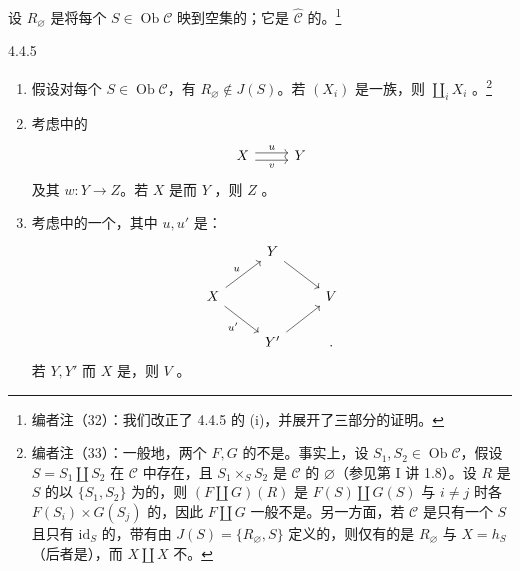 设 $R_{\varnothing}$ 是将每个 $S\in\operatorname{Ob}\mathcal C$ 映到空集的；它是 $\widehat{\mathcal C}$ 的。\footnote{编者注（32）：我们改正了 4.4.5 的 (i)，并展开了三部分的证明。}
\begin{SGAresult}{}{4.4.5}
\begin{enumerate}
\item[(i)] 假设对每个 $S\in\operatorname{Ob}\mathcal C$，有 $R_{\varnothing}\notin J(S)$。若 $(X_i)$ 是一族，则 $\coprod_i X_i$ 。\footnote{编者注（33）：一般地，两个 $F,G$ 的不是。事实上，设 $S_1,S_2\in\operatorname{Ob}\mathcal C$，假设 $S=S_1\amalg S_2$ 在 $\mathcal C$ 中存在，且 $S_1\times_S S_2$ 是 $\mathcal C$ 的 $\varnothing$（参见第 I 讲 1.8）。设 $R$ 是 $S$ 的以 $\{S_1,S_2\}$ 为的，则 $(F\amalg G)(R)$ 是 $F(S)\amalg G(S)$ 与 $i\ne j$ 时各 $F(S_i)\times G(S_j)$ 的，因此 $F\amalg G$ 一般不是。另一方面，若 $\mathcal C$ 是只有一个 $S$ 且只有 $\mathrm{id}_S$ 的，带有由 $J(S)=\{R_{\varnothing},S\}$ 定义的，则仅有的是 $R_{\varnothing}$ 与 $X=h_S$（后者是），而 $X\amalg X$ 不。}
\item[(ii)] 考虑中的
\[
\begin{tikzcd}X\arrow[r,shift left=.6ex,"u"]\arrow[r,shift right=.6ex,"v"']&Y\end{tikzcd}
\]
及其 $w:Y\to Z$。若 $X$ 是而 $Y$ ，则 $Z$ 。
\item[(iii)] 考虑中的一个，其中 $u,u'$ 是：
\[
\begin{tikzcd}
&Y\arrow[dr]&\\
X\arrow[ur,"u"]\arrow[dr,"u'"']&&V\\
&Y'\arrow[ur]&.
\end{tikzcd}
\]
若 $Y,Y'$ 而 $X$ 是，则 $V$ 。
\end{enumerate}
\end{SGAresult}
